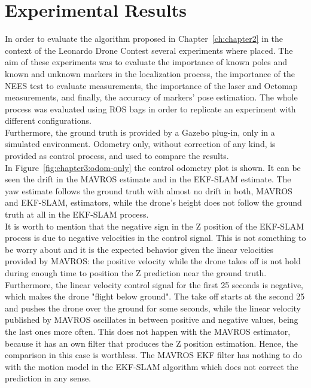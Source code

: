 \chapter{Experimental Results}
\label{chapter3}
In order to evaluate the algorithm proposed in Chapter~\ref{ch:chapter2} in the context of the Leonardo Drone Contest several experiments where placed. The aim of these experiments was to evaluate the importance of known poles and known and unknown markers in the localization process, the importance of the NEES test to evaluate measurements, the importance of the laser and Octomap measurements, and finally, the accuracy of markers' pose estimation. The whole process was evaluated using ROS bags in order to replicate an experiment with different configurations.\\

Furthermore, the ground truth is provided by a Gazebo plug-in, only in a simulated environment. Odometry only, without correction of any kind, is provided as control process, and used to compare the results. \\

In Figure~\ref{fig:chapter3:odom-only} the control odometry plot is shown. It can be seen the drift in the MAVROS estimate and in the EKF-SLAM estimate. The yaw estimate follows the ground truth with almost no drift in both, MAVROS and EKF-SLAM, estimators, while the drone's height does not follow the ground truth at all in the EKF-SLAM process.\\

It is worth to mention that the negative sign in the Z position of the EKF-SLAM process is due to negative velocities in the control signal. This is not something to be worry about and it is the expected behavior given the linear velocities provided by MAVROS: the positive velocity while the drone takes off is not hold during enough time to position the Z prediction near the ground truth. Furthermore, the linear velocity control signal for the first 25 seconds is negative, which makes the drone "flight below ground". The take off starts at the second 25 and pushes the drone over the ground for some seconds, while the linear velocity published by MAVROS oscillates in between positive and negative values, being the last ones more often. This does not happen with the MAVROS estimator, because it has an own filter that produces the Z position estimation. Hence, the comparison in this case is worthless. The MAVROS EKF filter has nothing to do with the motion model in the EKF-SLAM algorithm which does not correct the prediction in any sense.\\

